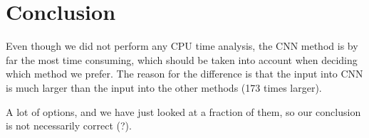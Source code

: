 \section{Conclusion} \label{sec:conclusion}
Even though we did not perform any CPU time analysis, the CNN method is by far the most time consuming, which should be taken into account when deciding which method we prefer. The reason for the difference is that the input into CNN is much larger than the input into the other methods (173 times larger). 

A lot of options, and we have just looked at a fraction of them, so our conclusion is not necessarily correct (?).
